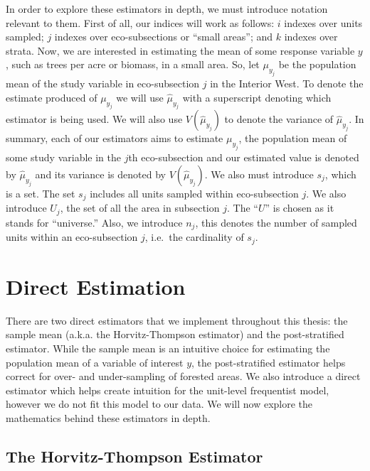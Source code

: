 \documentclass[12pt,twoside]{reedthesis}
\begin{document}
In order to explore these estimators in depth, we must introduce notation relevant to them. First of all, our indices will work as follows: \(i\) indexes over units sampled; \(j\) indexes over eco-subsections or ``small areas''; and \(k\) indexes over strata. Now, we are interested in estimating the mean of some response variable \(y\), such as trees per acre or biomass, in a small area. So, let \(\mu_{y_j}\) be the population mean of the study variable in eco-subsection \(j\) in the Interior West. To denote the estimate produced of \(\mu_{y_j}\) we will use \(\hat\mu_{y_j}\) with a superscript denoting which estimator is being used. We will also use \(V(\hat\mu_{y_j})\) to denote the variance of \(\hat\mu_{y_j}\). In summary, each of our estimators aims to estimate \(\mu_{y_j}\), the population mean of some study variable in the \(j\)th eco-subsection and our estimated value is denoted by \(\hat\mu_{y_j}\) and its variance is denoted by \(V(\hat\mu_{y_j})\). We also must introduce \(s_j\), which is a set. The set \(s_j\) includes all units sampled within eco-subsection \(j\). We also introduce \(U_j\), the set of all the area in subsection \(j\). The ``\(U\)'' is chosen as it stands for ``universe.'' Also, we introduce \(n_j\), this denotes the number of sampled units within an eco-subsection \(j\), i.e.~the cardinality of \(s_j\).

\hypertarget{direct-estimation}{%
\section{Direct Estimation}\label{direct-estimation}}

There are two direct estimators that we implement throughout this thesis: the sample mean (a.k.a. the Horvitz-Thompson estimator) and the post-stratified estimator. While the sample mean is an intuitive choice for estimating the population mean of a variable of interest \(y\), the post-stratified estimator helps correct for over- and under-sampling of forested areas. We also introduce a direct estimator which helps create intuition for the unit-level frequentist model, however we do not fit this model to our data. We will now explore the mathematics behind these estimators in depth.

\hypertarget{the-horvitz-thompson-estimator}{%
\subsection{The Horvitz-Thompson Estimator}\label{the-horvitz-thompson-estimator}}
\end{document}
